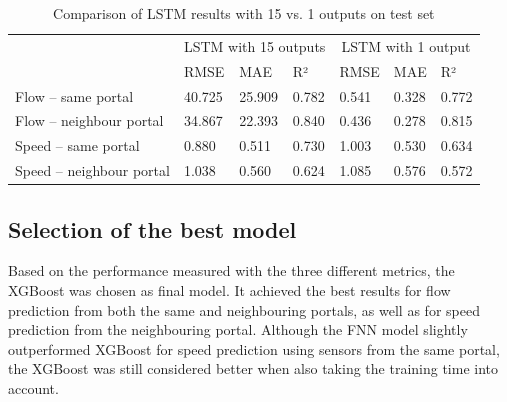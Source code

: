 	\begin{table}[H]
		\centering
		\caption{Comparison of LSTM results with 15 vs. 1 outputs on test set}
		\label{tab:result_LSTM_comparison}
		\begin{tabular}{l|lll|lll}
			 & \multicolumn{3}{c|}{LSTM with 15 outputs} & \multicolumn{3}{c}{LSTM with 1 output} \\
			& RMSE & MAE & R² & RMSE & MAE & R² \\
			\hline
			Flow – same portal      & 40.725 & 25.909 & 0.782 & 0.541 & 0.328 & 0.772 \\
			Flow – neighbour portal & 34.867 & 22.393 & 0.840 & 0.436 & 0.278 & 0.815 \\
			Speed – same portal     & 0.880  & 0.511  & 0.730 & 1.003 & 0.530 & 0.634 \\
			Speed – neighbour portal & 1.038 & 0.560  & 0.624 & 1.085 & 0.576 & 0.572 \\
		\end{tabular}
	\end{table}
	\subsection{Selection of the best model}
	Based on the performance measured with the three different metrics, the XGBoost was chosen as final model. It achieved the best results for flow prediction from both the same and neighbouring portals, as well as for speed prediction from the neighbouring portal. Although the FNN model slightly outperformed XGBoost for speed prediction using sensors from the same portal, the XGBoost was still considered better when also taking the training time into account. 

